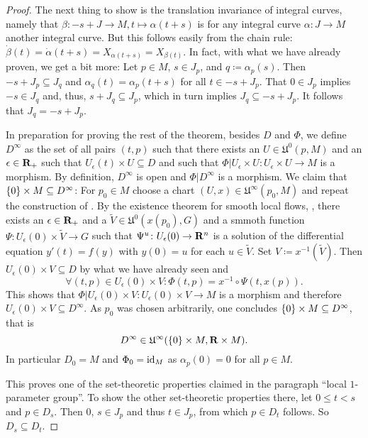 \begin{proof}
  The next thing to show is the translation invariance of integral curves,
  namely that
  $\beta\colon -s + J \to M, t \mapsto \alpha(t + s)$ is for any integral
  curve $\alpha\colon J \to M$ another integral curve. But this follows
  easily from the chain rule:
  $\dot\beta(t) = \dot\alpha(t + s) = X_{\alpha(t + s)} = X_{\beta(t)}$.
  In fact, with what we have already proven, we get a bit more:
  Let $p \in M$, $s \in J_p$, and $q \coloneqq \alpha_p(s)$. Then
  $-s + J_p \subseteq J_q$ and $\alpha_q(t) = \alpha_p(t + s)$ for all
  $t \in -s + J_p$. That $0 \in J_p$ implies $-s \in J_q$ and, thus,
  $s + J_q \subseteq J_p$, which in turn implies $J_q \subseteq -s + J_p$.
  It follows that $J_q = -s + J_p$.

  In preparation for proving the rest of the theorem, besides $D$ and $\Phi$,
  we define $D^\infty$ as the set of all pairs $(t, p)$ such that
  there exists an $U \in \mathfrak U^0(p, M)$ and an $\epsilon \in \mathbf{R}_+$
  such that $U_\epsilon(t) \times U \subseteq D$ and
  such that $\Phi|U_\epsilon \times U\colon U_\epsilon \times U \to M$
  is a morphism. By definition, $D^\infty$ is open and $\Phi|D^\infty$ is
  a morphism. We claim that $\lbrace0\rbrace \times M \subseteq D^\infty$: For $p_0
  \in M$ choose a chart $(U, x) \in \mathfrak U^\infty(p_0, M)$ and repeat
  the construction of . By the existence theorem
  for smooth local flows, , there exists an
  $\epsilon \in \mathbf{R}_+$ and a $\widetilde V \in \mathfrak U^0(x(p_0), G)$
  and a smmoth function $\Psi\colon U_\epsilon(0) \times \widetilde V \to
  G$ such that $\Psi^u\colon U_\epsilon(0) \to \mathbf{R}^n$ is a solution
  of the differential equation $y'(t) = f(y)$ with $y(0) = u$ for each $u
  \in \widetilde V$. Set $V \coloneqq x^{-1}(\tilde V)$. Then $U_\epsilon(0)
  \times V \subseteq D$ by what we have already seen and
  \[
    \forall (t, p) \in U_\epsilon(0) \times V: \Phi(t, p) = x^{-1}
    \circ \Psi(t, x(p)).
  \]
  This shows that $\Phi|U_\epsilon(0) \times V: U_\epsilon(0) \times V \to M$
  is a morphism and therefore $U_\epsilon(0) \times V \subseteq D^\infty$. As
  $p_0$ was chosen arbitrarily, one concludes $\lbrace0\rbrace \times M
  \subseteq D^\infty$, that is
  \[
    D^\infty \in \mathfrak U^\infty(\lbrace0\rbrace \times M,
    \mathbf{R} \times M).
  \]
  In particular $D_0 = M$ and $\Phi_0 = \mathrm{id}_M$ as $\alpha_p(0) = 0$ for all
  $p \in M$.
  
  This proves one of the set-theoretic properties claimed in the paragraph
  ``local $1$-parameter group''. To show the other set-theoretic properties
  there, let $0 \leq t < s$ and $p \in D_s$. Then $0$, $s \in J_p$ and thus
  $t \in J_p$, from which $p \in D_t$ follows. So $D_s \subseteq D_t$.
  

\end{proof}
